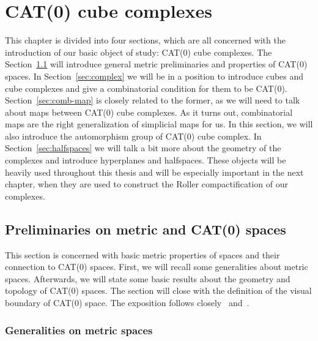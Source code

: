 \section{CAT(0) cube complexes}
\label{sec:complexes}
This chapter is divided into four sections, which are all concerned with the introduction of our basic object of study: CAT(0) cube complexes. The Section~\ref{sec:metric} will introduce general metric preliminaries and properties of CAT(0) spaces. In Section~\ref{sec:complex} we will be in a position to introduce cubes and cube complexes and give a combinatorial condition for them to be CAT(0). Section~\ref{sec:comb-map} is closely related to the former, as we will need to talk about maps between CAT(0) cube complexes. As it turns out, combinatorial maps are the right generalization of simplicial maps for us. In this section, we will also introduce the automorphism group of CAT(0) cube complex. In Section~\ref{sec:halfspaces} we will talk a bit more about the geometry of the complexes and introduce hyperplanes and halfspaces. These objects will be heavily used throughout this thesis and will be especially important in the next chapter, when they are used to construct the Roller compactification of our complexes.

\subsection{Preliminaries on metric and CAT(0) spaces}
\label{sec:metric}
This section is concerned with basic metric properties of spaces and their connection to CAT(\(0\)) spaces. First, we will recall some generalities about metric spaces. Afterwards, we will state some basic results about the geometry and topology of CAT(0) spaces. The section will close with the definition of the visual boundary of CAT(0) space. The exposition follows closely~\cite{MR1744486} and~\cite{Rolli2012}.

\subsubsection*{Generalities on metric spaces}
\label{sec:gen-met}

